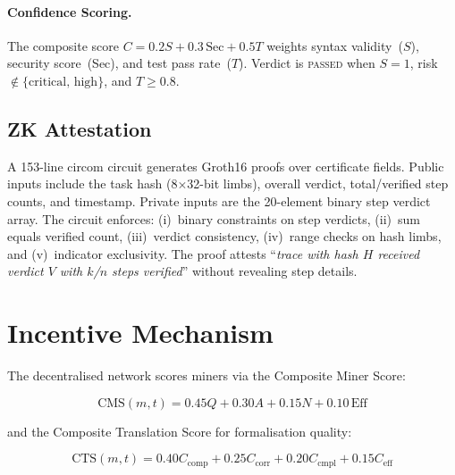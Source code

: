 \documentclass[10pt,a4paper,twocolumn]{article}
\begin{document}
\paragraph{Confidence Scoring.} The composite score
$C = 0.2 S + 0.3\,\text{Sec} + 0.5 T$ weights syntax validity~($S$),
security score~(Sec), and test pass rate~($T$).  Verdict is
\textsc{passed} when $S=1$, risk $\notin \{\text{critical, high}\}$, and
$T \geq 0.8$.

\subsection{ZK Attestation}

A 153-line circom circuit generates Groth16 proofs over certificate
fields.  Public inputs include the task hash (8$\times$32-bit limbs),
overall verdict, total/verified step counts, and timestamp.  Private
inputs are the 20-element binary step verdict array.  The circuit
enforces: (i)~binary constraints on step verdicts, (ii)~sum equals
verified count, (iii)~verdict consistency, (iv)~range checks on hash
limbs, and (v)~indicator exclusivity.  The proof attests ``\emph{trace
with hash $H$ received verdict $V$ with $k$/$n$ steps verified}''
without revealing step details.

\section{Incentive Mechanism}

The decentralised network scores miners via the Composite Miner Score:

\vspace{-4pt}
\begin{equation}
  \text{CMS}(m,t) = 0.45 Q + 0.30 A + 0.15 N + 0.10\,\text{Eff}
\end{equation}
\vspace{-4pt}

\noindent and the Composite Translation Score for formalisation quality:

\vspace{-4pt}
\begin{equation}
  \text{CTS}(m,t) = 0.40 C_{\text{comp}} + 0.25 C_{\text{corr}}
    + 0.20 C_{\text{cmpl}} + 0.15 C_{\text{eff}}
\end{equation}
\vspace{-4pt}
\end{document}
